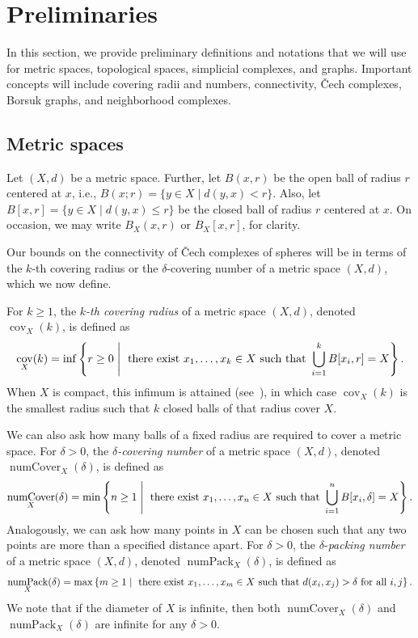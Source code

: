 \documentclass[11 pt,a4paper,twoside,reqno]{amsart}
\theoremstyle{definition}
\DeclareMathOperator{\cov}{cov}
\DeclareMathOperator{\numcov}{numCover}
\DeclareMathOperator{\numpack}{numPack}
\begin{document}
\section{Preliminaries}
\label{sec:prelim}

In this section, we provide preliminary definitions and notations that we will use for metric spaces, topological spaces, simplicial complexes, and graphs.
Important concepts will include covering radii and numbers, connectivity, \v{C}ech complexes, Borsuk graphs, and neighborhood complexes.



\subsection{Metric spaces}
\label{ssec:metric}

Let $(X,d)$ be a metric space.
Further, let $B(x,r)$ be the open ball of radius $r$ centered at $x$, i.e., $B(x;r)=\{y\in X \mid d(y,x)<r\}$.
Also, let $B[x,r]=\{y\in X \mid d(y,x)\leq r\}$ be the closed ball of radius $r$ centered at $x$.
{On occasion, we may write $B_X(x,r)$ or $B_X[x,r]$, for clarity.}

Our bounds on the connectivity of \v{C}ech complexes of spheres will be in terms of the $k$-th covering radius or the $\delta$-covering number of a metric space $(X,d)$, which we now define.

For $k\ge 1$, the \emph{$k$-th covering radius} of a metric space $(X,d)$, denoted $\cov_X(k)$, is defined as 
\[
\cov_X(k) = \inf\left\{r\ge 0 \hspace{1mm} \middle| \hspace{1mm} \text{ there exist } x_1,\ldots,x_k \in X \text{ such that } \bigcup_{i=1}^k B[x_i,r] = X \right\}.
\]
When $X$ is compact, this infimum is attained (see~\cite[Lemma~3.1]{ABV}), in which case $\cov_X(k)$ is the smallest radius such that $k$ closed balls of that radius cover $X$.

We can also ask how many balls of a fixed radius are required to cover a metric space.
For $\delta>0$, the \emph{$\delta$-covering number} of a metric space $(X,d)$, denoted $\numcov_X(\delta)$, is defined as 
\[
\numcov_X(\delta) = \min\left\{n \ge 1 \hspace{1mm} \middle| \hspace{1mm} \text{ there exist } x_1,\ldots,x_n \in X \text{ such that } \bigcup_{i=1}^n B[x_i,\delta] = X \right\}.
\]
Analogously, we can ask how many points in $X$ can be chosen such that any two points are more than a specified distance apart.
For $\delta>0$, the $\delta$-\emph{packing number} of a metric space $(X,d)$, denoted $\numpack_{X}(\delta)$, is defined as
\[
\numpack_{X}(\delta)=\max\left\{m \ge 1 \hspace{1mm} \middle| \hspace{1mm} \text{ there exist } x_1,\ldots,x_m \in X \text{ such that } d(x_i,x_j) > \delta \text{ for all } i,j \right\}.
\]
We note that if the diameter of $X$ is infinite, then both $\numcov_X(\delta)$ and $\numpack_X(\delta)$ are infinite for any $\delta> 0$.
\end{document}
